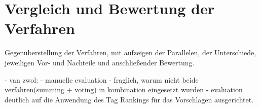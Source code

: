 \section{Vergleich und Bewertung der Verfahren} %
\label{sec:vergleich_und_bewertung_der_verfahren}
Gegenüberstellung der Verfahren, mit aufzeigen der Parallelen, der Unterschiede, jeweiligen Vor- und Nachteile und anschließender Bewertung.


- van zwol: 
 - manuelle evaluation
 - fraglich, warum nicht beide verfahren(summing + voting) in kombination eingesetzt wurden
 - evaluation deutlich auf die Anwendung des Tag Rankings für das Vorschlagen ausgerichtet.

